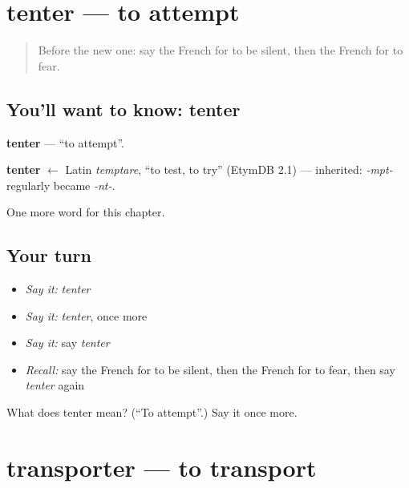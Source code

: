 \section[tenter]{tenter — to attempt}

\label{lesson:FR-C211-tenter}



\begin{quote}
Before the new one: say the French for to be silent, then the French for to fear.
\end{quote}

\subsection*{You'll want to know: tenter}
\textbf{tenter} — \textquotedblleft{}to attempt\textquotedblright{}.

\begin{cousinweb}
\textbf{tenter} $\leftarrow$ Latin \emph{temptare}, \textquotedblleft{}to test, to try\textquotedblright{} (EtymDB 2.1) — inherited: \emph{-mpt-} regularly became \emph{-nt-}.
\end{cousinweb}

\begin{grammarlens}[title={What you've built}]
One more word for this chapter.
\end{grammarlens}

\subsection*{Your turn}
\begin{itemize}
\raggedright
  \item \emph{Say it:} \emph{tenter}
  \item \emph{Say it:} \emph{tenter}, once more
  \item \emph{Say it:} say \emph{tenter}
  \item \emph{Recall:} say the French for to be silent, then the French for to fear, then say \emph{tenter} again
\end{itemize}

\begin{tcolorbox}[breakable,colback=teal!4,colframe=teal!35!black,title={Before you move on}]
What does tenter mean? (\textquotedblleft{}To attempt\textquotedblright{}.) Say it once more.
\end{tcolorbox}
\section[transporter]{transporter — to transport}


